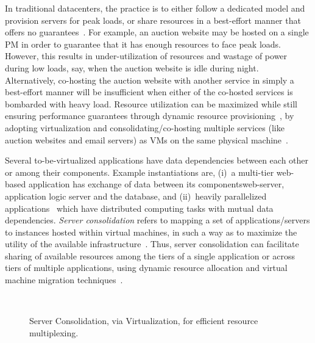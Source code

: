 
In traditional datacenters, the practice is to either follow
a dedicated model and provision servers for peak loads, or share
resources in a best-effort manner that offers no
guarantees~\cite{resource-overbooking}.
For example, an auction website may be hosted on a single PM
in order to guarantee that it has enough resources to face peak loads.
However, this
results in under-utilization of resources and wastage of power during
low loads, say, when the auction website is idle during night.
Alternatively, co-hosting the auction website with another service 
in simply a
best-effort manner will be insufficient when either of the
co-hosted services is bombarded with heavy load.
Resource utilization can be maximized while still ensuring performance
guarantees through dynamic resource provisioning~\cite{sandpiper, 
vm-multiplexing}, by adopting virtualization
and consolidating/co-hosting multiple services (like
auction websites and email servers) as VMs on the same physical
machine~\cite{entropy}.

Several to-be-virtualized applications have data dependencies
between each other or among their components.
Example instantiations are, (i)~a multi-tier web-based application has
exchange of data
between its components\textemdash{}web-server, application logic server
and the database, and 
(ii)~heavily parallelized applications~\cite{high-consuming-parallel}
which have distributed computing tasks with mutual data dependencies.
\textit{Server consolidation} refers to mapping a set of applications/servers
to instances hosted within
virtual machines, in such a way as to maximize the utility of the
available infrastructure~\cite{load-balancing}.
Thus, server consolidation can facilitate sharing of available resources
among the tiers of a single application or 
across tiers of multiple applications,
using dynamic resource allocation and virtual machine
migration techniques~\cite{sandpiper, adaptation-engine}.


\begin{figure}[h]
	\centering
	~~~~~~~~~~~~~~~~~~~~~~~~
\caption{Server Consolidation, via Virtualization, for efficient resource multiplexing.}
\label{virtualization-enables-consolidation}
\end{figure}

